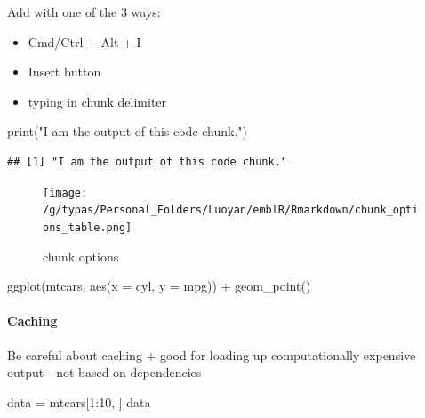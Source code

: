 \documentclass[
]{article}
\newenvironment{Shaded}{\begin{snugshade}}{\end{snugshade}}
\newcommand{\AttributeTok}[1]{\textcolor[rgb]{0.77,0.63,0.00}{#1}}
\newcommand{\DecValTok}[1]{\textcolor[rgb]{0.00,0.00,0.81}{#1}}
\newcommand{\FunctionTok}[1]{\textcolor[rgb]{0.00,0.00,0.00}{#1}}
\newcommand{\NormalTok}[1]{#1}
\newcommand{\OtherTok}[1]{\textcolor[rgb]{0.56,0.35,0.01}{#1}}
\newcommand{\SpecialCharTok}[1]{\textcolor[rgb]{0.00,0.00,0.00}{#1}}
\newcommand{\StringTok}[1]{\textcolor[rgb]{0.31,0.60,0.02}{#1}}
\begin{document}
Add with one of the 3 ways:

\begin{itemize}
\item
  Cmd/Ctrl + Alt + I
\item
  Insert button
\item
  typing in chunk delimiter
\end{itemize}

\begin{Shaded}
\begin{Highlighting}[]
\FunctionTok{print}\NormalTok{(}\StringTok{"I am the output of this code chunk."}\NormalTok{)}
\end{Highlighting}
\end{Shaded}

\begin{verbatim}
## [1] "I am the output of this code chunk."
\end{verbatim}

\begin{figure}
\centering
\texttt{[image: /g/typas/Personal\_Folders/Luoyan/emblR/Rmarkdown/chunk\_options\_table.png]}
\caption{chunk options}
\end{figure}

\begin{Shaded}
\begin{Highlighting}[]
\FunctionTok{ggplot}\NormalTok{(mtcars, }\FunctionTok{aes}\NormalTok{(}\AttributeTok{x =}\NormalTok{ cyl, }\AttributeTok{y =}\NormalTok{ mpg)) }\SpecialCharTok{+} 
  \FunctionTok{geom\_point}\NormalTok{()}
\end{Highlighting}
\end{Shaded}

\hypertarget{caching}{%
\paragraph{Caching}\label{caching}}

Be careful about caching + good for loading up computationally expensive
output - not based on dependencies

\begin{Shaded}
\begin{Highlighting}[]
\NormalTok{data }\OtherTok{=}\NormalTok{ mtcars[}\DecValTok{1}\SpecialCharTok{:}\DecValTok{10}\NormalTok{, ]}
\NormalTok{data}
\end{Highlighting}
\end{Shaded}
\end{document}
